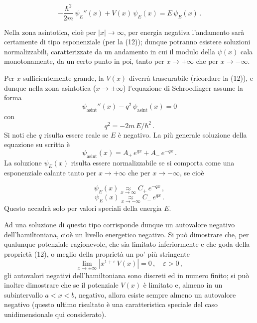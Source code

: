 \documentclass[11pt, a4paper]{book}
\numberwithin{equation}{section}
\begin{document}

\begin{equation}
-\frac{\hbar^2}{2m}\, \psi_E''(x) + V(x)\, \psi_E(x) = E\, \psi_E(x) \,. \tag{13}
\end{equation}


Nella zona asintotica, cioè per $|x| \to \infty$, per energia negativa
l'andamento sarà certamente di tipo esponenziale (per la (12)); dunque
potranno esistere soluzioni normalizzabili, caratterizzate da un andamento
in cui il modulo della $\psi(x)$ cala monotonamente, da un certo punto
in poi, tanto per $x \to +\infty$ che per $x \to -\infty$.

Per $x$ sufficientemente grande, la $V(x)$ diverrà trascurabile (ricordare la (12)), e dunque nella zona asintotica ($x \to \pm\infty$) l'equazione
di Schroedinger assume la forma
\[
\psi_{\text{asint}}''(x) - q^2\, \psi_{\text{asint}}(x) = 0
\]
con
\[
q^2 = -2m\, E / \hbar^2 \,.
\]
Si noti che $q$ risulta essere reale se $E$ è negativo. La più generale soluzione
della equazione su scritta è
\[
\psi_{\text{asint}}(x) = A_+\, e^{qx} + A_-\, e^{-qx} \,.
\]
La soluzione $\psi_E(x)$ risulta essere normalizzabile se si comporta
come una esponenziale calante tanto per $x \to +\infty$ che per $x \to -\infty$,
se cioè


\[
\psi_E(x) \underset{x \to \infty}{\approx} C_+\, e^{-qx} \,,
\]
\[
\psi_E(x) \underset{x \to -\infty}{\approx} C_-\, e^{qx} \,.
\]
Questo accadrà solo per valori speciali della energia $E$.

Ad una soluzione di questo tipo corrisponde dunque un autovalore
negativo dell'hamiltoniana, cioè un livello energetico negativo. Si può
dimostrare che, per qualunque potenziale ragionevole, che sia limitato
inferiormente e che goda della proprietà (12), o meglio della proprietà
un po' più stringente
\begin{equation}
\lim_{x \to \pm\infty} \left|x^{1+\varepsilon}\, V(x)\right| = 0 \,, \quad \varepsilon > 0 \,, \tag{14}
\end{equation}
gli autovalori negativi dell'hamiltoniana sono discreti ed in numero finito;
si può inoltre dimostrare che se il potenziale $V(x)$ è limitato e, almeno in
un subintervallo $a < x < b$, negativo, allora esiste sempre almeno
un autovalore negativo (questo ultimo risultato è una caratteristica speciale
del caso unidimensionale qui considerato).
\end{document}
